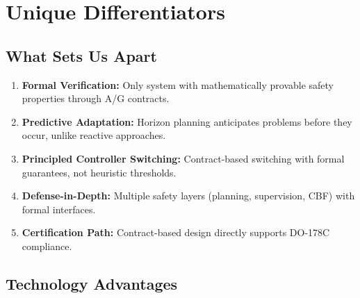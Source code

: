 \section{Unique Differentiators}

\subsection{What Sets Us Apart}

\begin{enumerate}
    \item \textbf{Formal Verification:} Only system with mathematically provable safety properties through A/G contracts.

    \item \textbf{Predictive Adaptation:} Horizon planning anticipates problems before they occur, unlike reactive approaches.

    \item \textbf{Principled Controller Switching:} Contract-based switching with formal guarantees, not heuristic thresholds.

    \item \textbf{Defense-in-Depth:} Multiple safety layers (planning, supervision, CBF) with formal interfaces.

    \item \textbf{Certification Path:} Contract-based design directly supports DO-178C compliance.
\end{enumerate}

\subsection{Technology Advantages}

